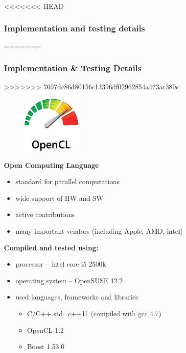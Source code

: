 \documentclass[10pt, xcolor=pdflatex, dvipsnames, table]{beamer}
\begin{document}
\begin{frame}
<<<<<<< HEAD
\frametitle{Implementation and testing details}
=======
\frametitle{Implementation \& Testing Details}
>>>>>>> 7697dc86d80156c13396df02962854a473ac389c
\begin{figure}
\includegraphics[width=3cm]{img/OpenCL_Logo.png}
\end{figure}
\textbf{Open Computing Language} 
\begin{itemize}
\item standard for parallel computations
\item wide support of HW and SW
\item active contributions 
\item many important vendors (including Apple, AMD, intel)
\end{itemize} 

\vspace{1em}

\textbf{Compiled and tested using:}
\begin{itemize}
\item processor -- intel core i5 2500k
\item operating system -- OpenSUSE 12.2
\item used languages, frameworks and libraries 
  \begin{itemize}
  \item C/C++ std=c++11 (compiled with gcc 4.7)
  \item OpenCL 1.2
  \item Boost 1.53.0
  \end{itemize}
\end{itemize}
\end{frame}
\end{document}
